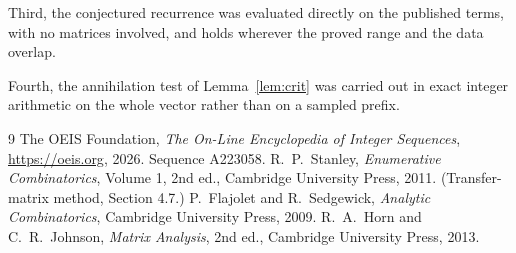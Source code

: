 \documentclass[11pt,a4paper]{article}
\theoremstyle{plain}
\theoremstyle{definition}
\begin{document}
Third, the conjectured recurrence was evaluated directly on the published terms, with no
matrices involved, and holds wherever the proved range and the data overlap.

Fourth, the annihilation test of Lemma~\ref{lem:crit} was carried out in exact integer
arithmetic on the whole vector rather than on a sampled prefix.

\begin{thebibliography}{9}
 The OEIS Foundation, \emph{The On-Line Encyclopedia of Integer
Sequences}, \url{https://oeis.org}, 2026. Sequence A223058.
 R.~P.~Stanley, \emph{Enumerative Combinatorics}, Volume 1, 2nd ed.,
Cambridge University Press, 2011. (Transfer-matrix method, Section 4.7.)
 P.~Flajolet and R.~Sedgewick, \emph{Analytic Combinatorics}, Cambridge
University Press, 2009.
 R.~A.~Horn and C.~R.~Johnson, \emph{Matrix Analysis}, 2nd ed., Cambridge
University Press, 2013.
\end{thebibliography}
\end{document}
